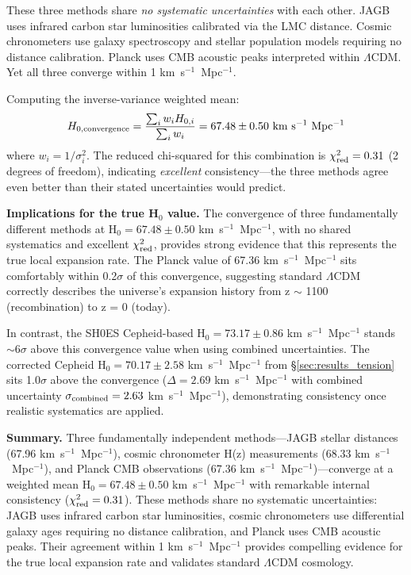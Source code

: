 \documentclass[twocolumn, linenumbers]{aastex701}
\begin{document}
These three methods share \textit{no systematic uncertainties} with each other. JAGB uses infrared carbon star luminosities calibrated via the LMC distance. Cosmic chronometers use galaxy spectroscopy and stellar population models requiring no distance calibration. Planck uses CMB acoustic peaks interpreted within $\Lambda$CDM. Yet all three converge within 1 km~s$^{-1}$~Mpc$^{-1}$.

Computing the inverse-variance weighted mean:
\begin{equation}
H_{0,\rm convergence} = \frac{\sum_i w_i H_{0,i}}{\sum_i w_i} = 67.48 \pm 0.50~{\rm km~s^{-1}~Mpc^{-1}}
\end{equation}
where $w_i = 1/\sigma_i^2$. The reduced chi-squared for this combination is $\chi^2_{\rm red} = 0.31$ (2 degrees of freedom), indicating \textit{excellent} consistency---the three methods agree even better than their stated uncertainties would predict.

\textbf{Implications for the true H$_0$ value.} The convergence of three fundamentally different methods at H$_0 = 67.48 \pm 0.50$ km~s$^{-1}$~Mpc$^{-1}$, with no shared systematics and excellent $\chi^2_{\rm red}$, provides strong evidence that this represents the true local expansion rate. The Planck value of 67.36 km~s$^{-1}$~Mpc$^{-1}$ sits comfortably within 0.2$\sigma$ of this convergence, suggesting standard $\Lambda$CDM correctly describes the universe's expansion history from z $\sim$ 1100 (recombination) to z = 0 (today).

In contrast, the SH0ES Cepheid-based H$_0 = 73.17 \pm 0.86$ km~s$^{-1}$~Mpc$^{-1}$ stands $\sim$6$\sigma$ above this convergence value when using combined uncertainties. The corrected Cepheid H$_0 = 70.17 \pm 2.58$ km~s$^{-1}$~Mpc$^{-1}$ from \S\ref{sec:results_tension} sits 1.0$\sigma$ above the convergence ($\Delta = 2.69$ km~s$^{-1}$~Mpc$^{-1}$ with combined uncertainty $\sigma_{\rm combined} = 2.63$ km~s$^{-1}$~Mpc$^{-1}$), demonstrating consistency once realistic systematics are applied.

\textbf{Summary.} Three fundamentally independent methods---JAGB stellar distances (67.96 km~s$^{-1}$~Mpc$^{-1}$), cosmic chronometer H(z) measurements (68.33 km~s$^{-1}$~Mpc$^{-1}$), and Planck CMB observations (67.36 km~s$^{-1}$~Mpc$^{-1}$)---converge at a weighted mean H$_0 = 67.48 \pm 0.50$ km~s$^{-1}$~Mpc$^{-1}$ with remarkable internal consistency ($\chi^2_{\rm red} = 0.31$). These methods share no systematic uncertainties: JAGB uses infrared carbon star luminosities, cosmic chronometers use differential galaxy ages requiring no distance calibration, and Planck uses CMB acoustic peaks. Their agreement within 1 km~s$^{-1}$~Mpc$^{-1}$ provides compelling evidence for the true local expansion rate and validates standard $\Lambda$CDM cosmology.
\end{document}
